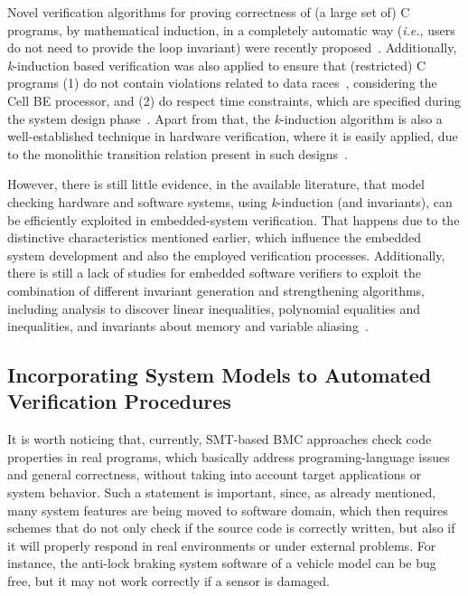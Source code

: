 \documentclass{acm_sen_article}
\begin{document}
Novel verification algorithms for proving correctness of (a large set of) C programs, by mathematical induction, in a completely automatic way ({\it i.e.}, users do not need to provide the loop invariant) were recently proposed~\cite{Gadelha15,Beyer15,Brain15,Rocha15}. Additionally, \textit{k}-induction based verification was also applied to ensure that (restricted) C programs (1) do not contain violations related to data races~\cite{Donaldson10,Kinductor}, considering the Cell BE processor, and (2) do respect time constraints, which are specified during the system design phase~\cite{EenS03}. Apart from that, the \textit{k}-induction algorithm is also a well-established technique in hardware verification, where it is easily applied, due to the monolithic transition relation present in such designs~\cite{EenS03,Sheera00,GrosseLD09}. 

However, there is still little evidence, in the available literature, that model checking hardware and software systems, using \textit{k}-induction (and invariants), can be efficiently exploited in embedded-system verification. That happens due to the distinctive characteristics mentioned earlier, which influence the embedded system development and also the employed verification processes. Additionally, there is still a lack of studies for embedded software verifiers to exploit the combination of different invariant generation and strengthening algorithms, including analysis to discover linear inequalities, polynomial equalities and inequalities, and invariants about memory and variable aliasing~\cite{Bradley07}.

\subsection{Incorporating System Models to Automated Verification Procedures}

It is worth noticing that, currently, SMT-based BMC approaches check code properties in real programs, which basically address programing-language issues and general correctness, without taking into account target applications or system behavior. Such a statement is important, since, as already mentioned, many system features are being moved to software domain, which then requires schemes that do not only check if the source code is correctly written, but also if it will properly respond in real environments or under external problems. For instance, the anti-lock braking system software of a vehicle model can be bug free, but it may not work correctly if a sensor is damaged.
\end{document}
